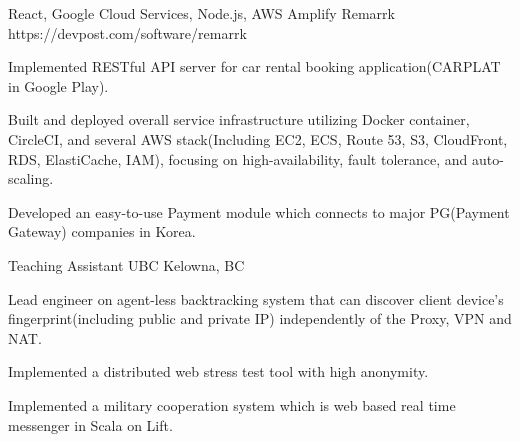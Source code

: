 


\begin{cventries}

  \cventry
	{React, Google Cloud Services, Node.js, AWS Amplify} %
    {Remarrk} %
    {https://devpost.com/software/remarrk} %
    {} %
    {
      \begin{cvitems} %
        \item {Implemented RESTful API server for car rental booking application(CARPLAT in Google Play).}
        \item {Built and deployed overall service infrastructure utilizing Docker container, CircleCI, and several AWS stack(Including EC2, ECS, Route 53, S3, CloudFront, RDS, ElastiCache, IAM), focusing on high-availability, fault tolerance, and auto-scaling.}
        \item {Developed an easy-to-use Payment module which connects to major PG(Payment Gateway) companies in Korea.}
      \end{cvitems}
    }

  \cventry
    {Teaching Assistant} %
    {UBC} %
    {Kelowna, BC} %
    {} %
    {
      \begin{cvitems} %
        \item {Lead engineer on agent-less backtracking system that can discover client device's fingerprint(including public and private IP) independently of the Proxy, VPN and NAT.}
        \item {Implemented a distributed web stress test tool with high anonymity.}
        \item {Implemented a military cooperation system which is web based real time messenger in Scala on Lift.}
      \end{cvitems}
    }


\end{cventries}
